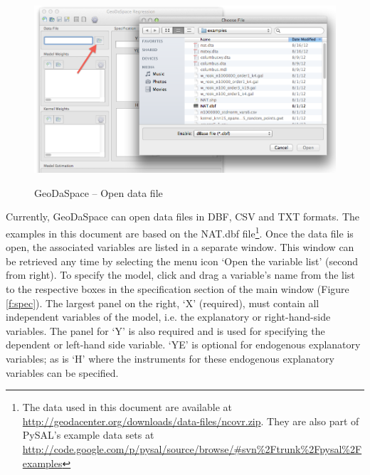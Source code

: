 \documentclass{article}
\begin{document}
\begin{figure}[htb]
\begin{center}
\includegraphics[width=0.9\linewidth]{opendb.png}\\
\caption{GeoDaSpace -- Open data file}
\label{f:opendb}
\end{center}
\end{figure}

Currently, GeoDaSpace can open data files in DBF, CSV and TXT formats. The examples in this document are based on the NAT.dbf file\footnote{The data used in this document are available at \url{http://geodacenter.org/downloads/data-files/ncovr.zip}. They are also part of PySAL's example data sets at \url{http://code.google.com/p/pysal/source/browse/\#svn\%2Ftrunk\%2Fpysal\%2Fexamples}}. Once the data file is open, the associated variables are listed in a separate window. This window can be retrieved any time by selecting the menu icon `Open the variable list' (second from right). To specify the model, click and drag a variable's name from the list to the respective boxes in the specification section of the main window (Figure \ref{f:spec}). The largest panel on the right, `X' (required), must contain all independent variables of the model, i.e. the explanatory or right-hand-side variables. The panel for `Y' is also required and is used for specifying the dependent or left-hand side variable. `YE'  is optional for endogenous explanatory variables; as is `H'  where the instruments for these endogenous explanatory variables can be specified.
\end{document}
